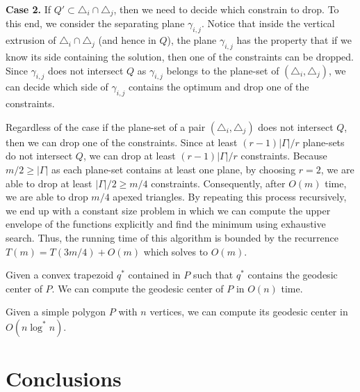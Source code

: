 \documentclass[a4paper,UKenglish]{lipics}
\begin{document}
\textbf{Case 2.} If $Q'\subset \triangle_i\cap \triangle_j$, then we need to decide which constrain to drop. 
To this end, we consider the separating plane $\gamma_{i,j}$. Notice that inside the vertical extrusion of $\triangle_i\cap \triangle_j$ (and hence in $Q$), the plane $\gamma_{i,j}$ has the property that if we know its side containing the solution, then one of the constraints can be dropped. Since $\gamma_{i,j}$ does not intersect $Q$ as $\gamma_{i,j}$ belongs to the plane-set of $(\triangle_i, \triangle_j)$, we can decide which side of $\gamma_{i,j}$ contains the optimum and drop one of the constraints.
\vspace{.1in}

Regardless of the case if the plane-set of a pair $(\triangle_i, \triangle_j)$ does not intersect $Q$, then we can drop one of the constraints. Since at least $(r-1)|\Gamma|/r$ plane-sets do not intersect $Q$, we can drop at least $(r-1)|\Gamma|/r$ constraints.
Because $m/2 \geq |\Gamma| $ as each plane-set contains at least one plane, by choosing $r = 2$, we are able to drop at least $|\Gamma|/2 \geq m/4$ constraints.
Consequently, after $O(m)$ time, we are able to drop $m/4$ apexed triangles.
By repeating this process recursively, we end up with a constant size problem in which we can compute the upper envelope of the functions explicitly and find the minimum using exhaustive search. 
Thus, the running time of this algorithm is bounded by the recurrence $T(m) = T(3m/4) + O(m)$ which solves to $O(m)$. 

\begin{theorem}
Given a convex trapezoid $q^*$ contained in $P$ such that $q^*$ contains the geodesic center of $P$. 
We can compute the geodesic center of $P$ in $O(n)$ time.
\end{theorem}

\begin{corollary}
Given a simple polygon $P$ with $n$ vertices, we can compute its geodesic center in $O(n \log ^* n)$.
\end{corollary}

\section{Conclusions}



\end{document}
